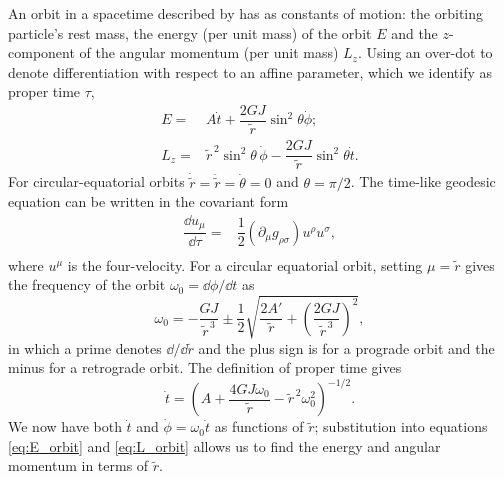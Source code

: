 An orbit in a spacetime described by  has as constants of motion: the orbiting particle's rest mass, the energy (per unit mass) of the orbit $E$ and the $z$-component of the angular momentum (per unit mass) $L_z$. Using an over-dot to denote differentiation with respect to an affine parameter, which we identify as proper time $\tau$,
\begin{align}
\label{eq:E_orbit}
E = {} & A\dot{t} + \dfrac{2GJ}{\widetilde{r}} \sin^2\theta\dot{\phi}; \\
L_z = {} & \widetilde{r}^{\,2}\sin^2\theta\, \dot{\phi} - \dfrac{2GJ}{\widetilde{r}} \sin^2\theta\dot{t} .
\label{eq:L_orbit}
\end{align}
For circular-equatorial orbits $\dot{\widetilde{r}} = \ddot{\widetilde{r}} = \dot{\theta}= 0$ and $\theta = \pi/2$. The time-like geodesic equation can be written in the covariant form
\begin{align}
\dfrac{\dd u_\mu}{\dd \tau} = {} & \dfrac{1}{2} \left(\partial_\mu g_{\rho\sigma} \right) u^\rho u^\sigma,\\
\end{align}
where $u^\mu$ is the four-velocity. For a circular equatorial orbit, setting $\mu = \widetilde{r}$ gives the frequency of the orbit $\omega_0 = \dd\phi/\dd t$ as
\begin{equation}
\omega_0 = -\dfrac{GJ}{\widetilde{r}^{\,3}} \pm \dfrac{1}{2} \sqrt{\dfrac{2A'}{\widetilde{r}} + \left(\dfrac{2GJ}{\widetilde{r}^{\,3}}\right)^2},
\label{eq:omz}
\end{equation}
in which a prime denotes $\dd/\dd\widetilde{r}$ and the plus sign is for a prograde orbit and the minus for a retrograde orbit. The definition of proper time gives
\begin{equation}
\dot{t} = \left(A + \dfrac{4GJ\omega_0}{\widetilde{r}} - \widetilde{r}^{\,2}\omega_0^2 \right)^{-1/2}.
\end{equation}
We now have both $\dot{t}$ and $\dot{\phi} = \omega_0\dot{t}$ as functions of $\widetilde{r}$; substitution into equations \eqref{eq:E_orbit} and \eqref{eq:L_orbit} allows us to find the energy and angular momentum in terms of $\widetilde{r}$.

